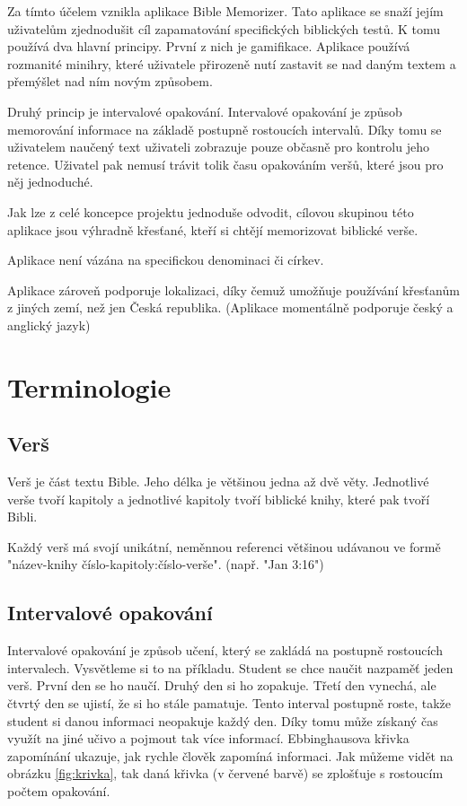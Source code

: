 \documentclass[12pt, a4paper, oneside]{article}
\begin{document}
	Za tímto účelem vznikla aplikace Bible Memorizer. Tato aplikace se snaží jejím uživatelům zjednodušit cíl zapamatování specifických biblických testů. K tomu používá dva hlavní principy. 
	První z nich je gamifikace. Aplikace používá rozmanité minihry, které uživatele přirozeně nutí zastavit se nad daným textem a přemýšlet nad ním novým způsobem.
	
	Druhý princip je intervalové opakování. Intervalové opakování je způsob memorování informace na základě postupně rostoucích intervalů. Díky tomu se uživatelem naučený text uživateli zobrazuje pouze občasně pro kontrolu jeho retence. Uživatel pak nemusí trávit tolik času opakováním veršů, které jsou pro něj jednoduché.
	
	Jak lze z celé koncepce projektu jednoduše odvodit, cílovou skupinou této aplikace jsou výhradně křesťané, kteří si chtějí memorizovat biblické verše.
		
	Aplikace není vázána na specifickou denominaci či církev.
	
	Aplikace zároveň podporuje lokalizaci, díky čemuž umožňuje používání křesťanům z jiných zemí, než jen Česká republika. (Aplikace momentálně podporuje český a anglický jazyk)
	
	\newpage
	\section{Terminologie}
	
	\subsection{Verš}
	Verš je část textu Bible. Jeho délka je většinou jedna až dvě věty. Jednotlivé verše tvoří kapitoly a jednotlivé kapitoly tvoří biblické knihy, které pak tvoří Bibli.
	
	Každý verš má svojí unikátní, neměnnou referenci většinou udávanou ve formě "název-knihy číslo-kapitoly:číslo-verše". (např. "Jan 3:16")
	
	\subsection{Intervalové opakování}
	Intervalové opakování \cite{space-repetition} je způsob učení, který se zakládá na postupně rostoucích intervalech. Vysvětleme si to na příkladu. Student se chce naučit nazpaměť jeden verš. První den se ho naučí. Druhý den si ho zopakuje. Třetí den vynechá, ale čtvrtý den se ujistí, že si ho stále pamatuje.
	Tento interval postupně roste, takže student si danou informaci neopakuje každý den. Díky tomu může získaný čas využít na jiné učivo a pojmout tak více informací.
	Ebbinghausova křivka zapomínání \cite{ebbinghaus} ukazuje, jak rychle člověk zapomíná informaci.
	Jak můžeme vidět na obrázku \ref{fig:krivka}, tak daná křivka (v červené barvě) se zplošťuje s rostoucím počtem opakování.
	
\end{document}
